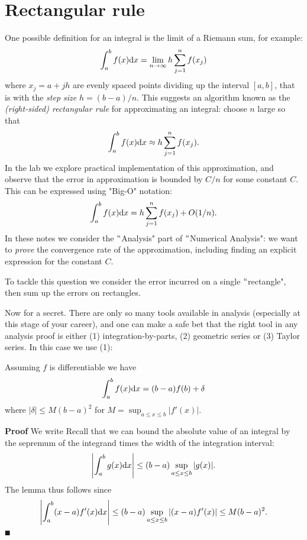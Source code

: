 
\section{Rectangular rule}
One possible definition for an integral is the limit of a Riemann sum, for example:
\[
  \ensuremath{\int}_a^b f(x) {\rm d}x = \lim_{n \ensuremath{\rightarrow} \ensuremath{\infty}} h \ensuremath{\sum}_{j=1}^n f(x_j)
\]
where $x_j = a+jh$ are evenly spaced points dividing up the interval $[a,b]$, that is  with the \emph{step size} $h = (b-a)/n$. This suggests an algorithm known as the \emph{(right-sided) rectangular rule} for approximating an integral: choose $n$ large so that
\[
  \ensuremath{\int}_a^b f(x) {\rm d}x \ensuremath{\approx} h \ensuremath{\sum}_{j=1}^n f(x_j).
\]
In the lab we explore practical implementation of this approximation, and observe that the error in approximation is bounded by $C/n$ for some constant $C$. This can be expressed using "Big-O" notation:
\[
\ensuremath{\int}_a^b f(x) {\rm d}x = h \ensuremath{\sum}_{j=1}^n f(x_j) + O(1/n).
\]
In these notes we consider the \ensuremath{\ldq}Analysis" part of \ensuremath{\ldq}Numerical Analysis": we want to \emph{prove} the convergence rate of the approximation, including finding an explicit expression for the constant $C$.

To tackle this question we consider the error incurred on a single \ensuremath{\ldq}rectangle", then sum up the errors on rectangles.

Now for a secret. There are only so many tools available in analysis (especially at this stage of your career), and one can make a safe bet that the right tool in any analysis proof is either (1) integration-by-parts, (2) geometric series or (3) Taylor series. In this case we use (1):

\begin{lemma} Assuming $f$ is differentiable we have
\[
\ensuremath{\int}_a^b f(x) {\rm d}x = (b-a) f(b) + \ensuremath{\delta}
\]
where $|\ensuremath{\delta}| \ensuremath{\leq} M (b-a)^2$ for $M = \sup_{a \ensuremath{\leq} x \ensuremath{\leq} b}|f'(x)|$.

\end{lemma}
\textbf{Proof} We write
Recall that we can bound the absolute value of an integral by the sepremum of the integrand times the width of the integration interval:
\[
\left|{\int_a^b g(x) {\rm d} x}\right| \leq (b-a) \sup_{a \leq x \leq b}|g(x)|.
\]
The lemma thus follows since
\[
\left|{\int_a^b (x-a) f'(x) {\rm d} x}\right| \leq (b-a) \sup_{a \leq x \leq b}|(x-a) f'(x)| \leq M (b-a)^2.
\]
\ensuremath{\QED}

